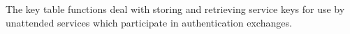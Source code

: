 The key table functions deal with storing and retrieving service keys
for use by unattended services which participate in authentication exchanges.

